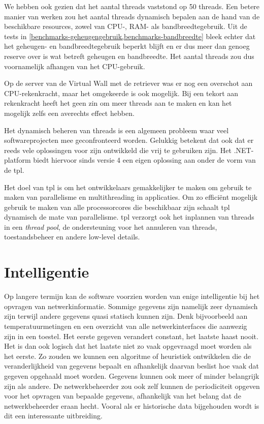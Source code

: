 We hebben ook gezien dat het aantal threads vaststond op 50 threads.
Een betere manier van werken zou het aantal threads dynamisch bepalen aan de hand van de beschikbare resources, zowel van CPU-, RAM- als bandbreedtegebruik.
Uit de tests in \cref{benchmarks-geheugengebruik,benchmarks-bandbreedte} bleek echter dat het geheugen- en bandbreedtegebruik beperkt blijft
en er dus meer dan genoeg reserve over is wat betreft geheugen en bandbreedte.
Het aantal threads zou dus voornamelijk afhangen van het CPU-gebruik.

Op de server van de Virtual Wall met de retriever was er nog een overschot aan CPU-rekenkracht,
maar het omgekeerde is ook mogelijk.
Bij een tekort aan rekenkracht heeft het geen zin om meer threads aan te maken en kan het mogelijk zelfs een averechts effect hebben.

Het dynamisch beheren van threads is een algemeen probleem waar veel softwareprojecten mee geconfronteerd worden.
Gelukkig betekent dat ook dat er reeds vele oplossingen voor zijn ontwikkeld die vrij te gebruiken zijn.
Het .NET-platform biedt hiervoor sinds versie 4 een eigen oplossing aan onder de vorm van de \gls{tpl}.

Het doel van \gls{tpl} is om het ontwikkelaars gemakkelijker te maken om gebruik te maken van parallelisme en multithreading in applicaties.
Om zo efficiënt mogelijk gebruik te maken van alle processorcores die beschikbaar zijn schaalt \gls{tpl} dynamisch de mate van parallelisme.
\Gls{tpl} verzorgt ook het inplannen van threads in een \textit{thread pool}, de ondersteuning voor het annuleren van threads, toestandsbeheer en
andere low-level details\cite{msdn-tpl}.


\section{Intelligentie}

Op langere termijn kan de software voorzien worden van enige intelligentie bij het opvragen van netwerkinformatie.
Sommige gegevens zijn namelijk zeer dynamisch zijn terwijl andere gegevens quasi statisch kunnen zijn.
Denk bijvoorbeeld aan temperatuurmetingen en een overzicht van alle netwerkinterfaces die aanwezig zijn in een toestel.
Het eerste gegeven verandert constant, het laatste haast nooit.
Het is dan ook logisch dat het laatste niet zo vaak opgevraagd moet worden als het eerste.
Zo zouden we kunnen een algoritme of heuristiek ontwikkelen die de veranderlijkheid van gegevens bepaalt en afhankelijk daarvan
beslist hoe vaak dat gegeven opgehaald moet worden.
Gegevens kunnen ook meer of minder belangrijk zijn als andere.
De netwerkbeheerder zou ook zelf kunnen de periodiciteit opgeven voor het opvragen van bepaalde gegevens,
afhankelijk van het belang dat de netwerkbeheerder eraan hecht.
Vooral als er historische data bijgehouden wordt is dit een interessante uitbreiding.


